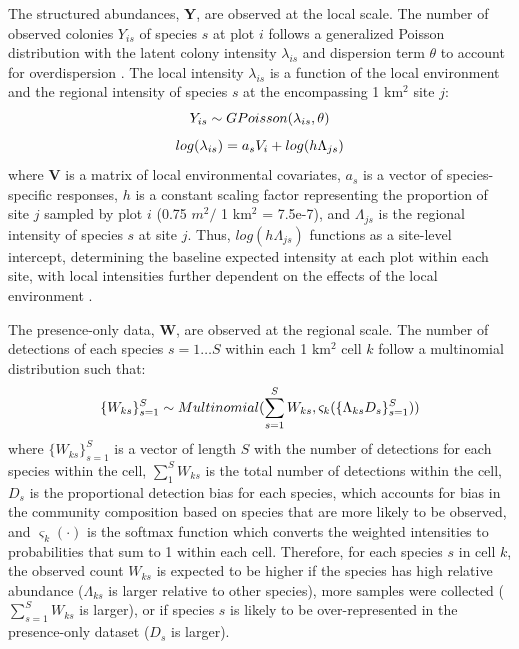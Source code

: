 \documentclass[preprint,review,times,12pt]{elsarticle}
\begin{document}
The structured abundances, \textbf{Y}, are observed at the local scale. The number of observed colonies $Y_{is}$ of species $s$ at plot $i$ follows a generalized Poisson distribution with the latent colony intensity $\lambda_{is}$ and dispersion term $\theta$ to account for overdispersion \citep{Consul1992,Ntzoufras2005}. The local intensity $\lambda_{is}$ is a function of the local environment and the regional intensity of species $s$ at the encompassing 1 km$^2$ site $j$:
    \begin{equation}
        Y_{is} \sim GPoisson(\lambda_{is}, \theta) \\
        \label{eq:Y_GP}
    \end{equation}
    \begin{equation}
        log(\lambda_{is}) = a_s V_i + log(h\Lambda_{js}) \\
        \label{eq:lambda}
    \end{equation}
where \textbf{V} is a matrix of local environmental covariates, $a_s$ is a vector of species-specific responses, $h$ is a constant scaling factor representing the proportion of site $j$ sampled by plot $i$ (0.75 $m^2 /$ 1 km$^2$ = 7.5e-7), and $\Lambda_{js}$ is the regional intensity of species $s$ at site $j$. Thus, $log(h\Lambda_{js})$ functions as a site-level intercept, determining the baseline expected intensity at each plot within each site, with local intensities further dependent on the effects of the local environment \citep{Yamaura2016}.

The presence-only data, \textbf{W}, are observed at the regional scale. The number of detections of each species $s=1 \dots S$ within each 1 km$^2$ cell $k$ follow a multinomial distribution such that:
    \begin{equation}
        \{W_{ks}\}_{s=1}^{S} \sim Multinomial(\sum_{s=1}^{S} W_{ks} , \varsigma_k(\{\Lambda_{ks}D_s\}_{s=1}^{S})) \\
        \label{eq:W_Mn}
    \end{equation}
where $\{W_{ks}\}_{s=1}^{S}$ is a vector of length $S$ with the number of detections for each species within the cell, $\sum_{1}^{S} W_{ks}$ is the total number of detections within the cell, $D_s$ is the proportional detection bias for each species, which accounts for bias in the community composition based on species that are more likely to be observed, and $\varsigma_k(\cdot)$ is the softmax function which converts the weighted intensities to probabilities that sum to 1 within each cell. Therefore, for each species $s$ in cell $k$, the observed count $W_{ks}$ is expected to be higher if the species has high relative abundance ($\Lambda_{ks}$ is larger relative to other species), more samples were collected ($\sum_{s=1}^{S} W_{ks}$ is larger), or if species $s$ is likely to be over-represented in the presence-only dataset ($D_s$ is larger). 
\end{document}
